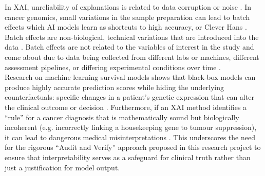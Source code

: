 In XAI, unreliability of explanations is related to data corruption or noise \cite{Klauschen2024}. In
cancer genomics, small variations in the sample preparation can lead to batch effects which AI models
learn as shortcuts to high accuracy, or Clever Hans \cite{Partin2023,Klauschen2024}. Batch effects are
non-biological, technical variations that are introduced into the data \cite{Yu2024,Goh2022}. Batch
effects are not related to the variables of interest in the study and come about due to data being
collected from different labs or machines, different assessment pipelines, or differing experimental
conditions over time \cite{Yu2024}.
\\
Research on machine learning survival models shows that black-box models can produce highly accurate
prediction scores while hiding the underlying counterfactuals: specific changes in a patient's genetic
expression that can alter the clinical outcome or decision \cite{Kovalev2021}. Furthermore, if an XAI
method identifies a ``rule'' for a cancer diagnosis that is mathematically sound but biologically
incoherent (e.g. incorrectly linking a housekeeping gene to tumour suppression), it can lead to
dangerous medical misinterpretations \cite{Partin2023,Klauschen2024}. This underscores the need for
the rigorous ``Audit and Verify'' approach proposed in this research project to ensure that
interpretability serves as a safeguard for clinical truth rather than just a justification for model
output.